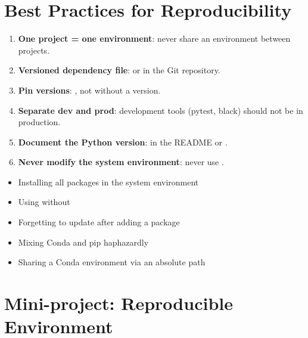 \section{Best Practices for Reproducibility}
\label{sec:env-best-practices}

\begin{bestpractice}[title=\textbf{Golden rules for environments}]
\begin{enumerate}
  \item \textbf{One project = one environment}: never share an environment
    between projects.
  \item \textbf{Versioned dependency file}:  or
     in the Git repository.
  \item \textbf{Pin versions}: , not  without
    a version.
  \item \textbf{Separate dev and prod}: development tools (pytest, black)
    should not be in production.
  \item \textbf{Document the Python version}: in the README or
    .
  \item \textbf{Never modify the system environment}: never use
    .
\end{enumerate}
\end{bestpractice}

\begin{antipattern}[title=\textbf{Common anti-patterns}]
\begin{itemize}
  \item Installing all packages in the system environment
  \item Using  without 
  \item Forgetting to update  after adding a package
  \item Mixing Conda and pip haphazardly
  \item Sharing a Conda environment via an absolute path
\end{itemize}
\end{antipattern}

\section{Mini-project: Reproducible Environment}
\label{sec:mini-project-ch2}

